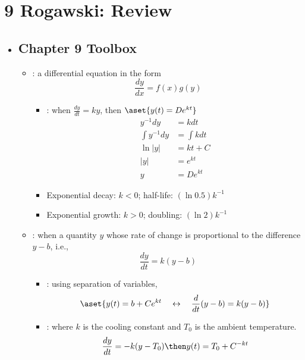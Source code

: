 \section{9 Rogawski: Review}
\begin{itemize}
  \item[]

  \subsection{Chapter 9 Toolbox}
  \begin{itemize}
    \item {}: a differential equation in the form
      \[%
      \frac{dy}{dx} = f (x) g (y)
      \]%
      \begin{itemize}
        \item {}: when \( \frac{dy}{dt} = ky \), then \(\aset{y
          (t) = De^{kt}}\)
          \begin{align*}
            y^{-1}dy &= kdt  \\
            \int y^{-1} dy &= \int kdt  \\
            \ln|y| &= kt + C \\
            |y| &= e^{kt}  \\
            y &= De^{kt}
          \end{align*}
        \item Exponential decay: \(k < 0\); half-life: \((\ln 0.5)k^{-1}\)
        \item Exponential growth: \(k > 0\); doubling: \((\ln 2)k^{-1}\)
      \end{itemize}

    \item {}: when a quantity \(y\)
      whose rate of change is proportional to the difference \(y-b\), i.e.,
      \[%
        \frac{dy}{dt} = k(y-b)
      \]%
    \begin{itemize}
      \item {}: using separation of variables,
        \[%
           \aset{ y (t) = b + Ce^{kt}
           \quad\leftrightarrow\quad
           \frac{d}{dt} (y-b) = k(y-b)}
        \]%
      \item {}: where \(k\) is the cooling constant
         and \(T_0\) is the ambient temperature.
        \[%
          \frac{dy}{dt} = -k(y-T_0) \then y (t) = T_0  + C^{-kt}
        \]%


\end{itemize}
\end{itemize}
\end{itemize}
